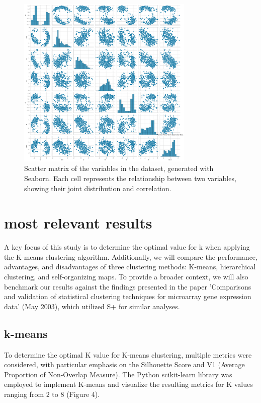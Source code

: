 \documentclass{llncs}
\begin{document}
\begin{figure}[h!]
	\begin{center}  %
		\includegraphics[width=0.75\textwidth]{images/Gene_Expression_Data.png}
		\caption{Scatter matrix of the variables in the dataset, generated with Seaborn. Each cell represents the relationship between two variables, showing their joint distribution and correlation.}
		\label{fig:bivariante}
	\end{center}
\end{figure}



\section{most relevant results}

A key focus of this study is to determine the optimal value for k when applying the K-means clustering algorithm. Additionally, we will compare the performance, advantages, and disadvantages of three clustering methods: K-means, hierarchical clustering, and self-organizing maps. To provide a broader context, we will also benchmark our results against the findings presented in the paper 'Comparisons and validation of statistical clustering techniques for microarray gene expression data' (May 2003), which utilized S+ for similar analyses.

\subsection{k-means}
 
 To determine the optimal K value for K-means clustering, multiple metrics were considered, with particular emphasis on the Silhouette Score and V1 (Average Proportion of Non-Overlap Measure). The Python scikit-learn library was employed to implement K-means and visualize the resulting metrics for K values ranging from 2 to 8 (Figure 4).
 
\end{document}
